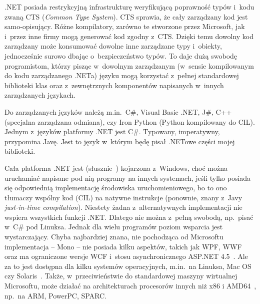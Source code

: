 .NET posiada restrykcyjną infrastrukturę weryfikującą poprawność typów i~kodu zwaną CTS (\emph{Common Type System}). CTS sprawia, że cały zarządzany kod jest samo-opisujący. Różne kompilatory, zarówno te stworzone przez Microsoft, jak i~przez inne firmy mogą generować kod zgodny z~CTS\@. Dzięki temu dowolny kod zarządzany może konsumować dowolne inne zarządzane typy i~obiekty, jednocześnie surowo dbając o~bezpieczeństwo typów. To daje dużą swobodę programistom, którzy pisząc w~dowolnym zarządzanym (w~sensie kompilowanym do kodu zarządzanego .NETa) języku mogą korzystać z~pełnej standardowej biblioteki klas oraz z~zewnętrznych komponentów napisanych w~innych zarządzanych językach.

Do zarządzanych języków należą m.in.\ C\#, Visual Basic .NET, J\#, C++ (specjalna zarządzana odmiana), czy Iron Python (Python kompilowany do CIL). Jednym z~języków platformy .NET jest C\#. Typowany, imperatywny, przypomina Javę. Jest to język w~którym będę pisał .NETowe części mojej biblioteki.

Cała platforma .NET jest (słusznie~\cite{dot-net-requirements}) kojarzona z~Windows, choć można uruchamiać napisane pod nią programy na innych systemach, jeśli tylko posiada się odpowiednią implementację środowiska uruchomieniowego, bo to ono tłumaczy wspólny kod (CIL) na natywne instrukcje (ponownie, znany z~Javy \emph{just-in-time compilation}). Niestety żadna z~alternatywnych implementacji nie wspiera wszystkich funkcji .NET\@.
Dlatego nie można z~pełną swobodą, np.\ pisać w~C\# pod Linuksa. Jednak dla wielu programów poziom wsparcia jest wystarczający.
Chyba najbardziej znana, nie pochodząca od Microsoftu implementacja -- Mono -- nie posiada kilku aspektów, takich jak WPF, WWF oraz ma ograniczone wersje WCF i~stosu asynchronicznego ASP.NET 4.5~\cite{mono-compatibility}. Ale za to jest dostępna dla kilku systemów operacyjnych, m.in.\ na Linuksa, Mac OS czy Solaris~\cite{mono-supported-platforms}. Także, w~przeciwieństwie do standardowej maszyny wirtualnej Microsoftu, może działać na architekturach procesorów innych niż x86 i AMD64~\cite{dot-net-requirements}, np.\ na ARM, PowerPC, SPARC.

